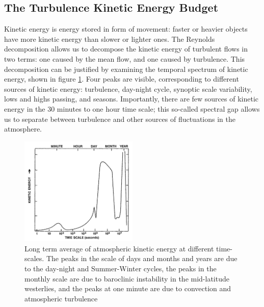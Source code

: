 \documentclass[a4paper,11pt]{kth-mag}
\begin{document}
\subsection{The Turbulence Kinetic Energy Budget}
Kinetic energy is energy stored in form of movement: faster or heavier objects have more kinetic energy than slower or lighter ones. The Reynolds decomposition allows us to decompose the kinetic energy of turbulent flows in two terms: one caused by the mean flow, and one caused by turbulence. This decomposition can be justified by examining the temporal spectrum of kinetic energy, shown in figure \ref{fig:tkespectrum}. Four peaks are visible, corresponding to different sources of kinetic energy: turbulence, day-night cycle, synoptic scale variability, lows and highs passing, and seasons. Importantly, there are few sources of kinetic energy in the 30 minutes to one hour time scale; this so-called spectral gap allows us to separate between turbulence and other sources of fluctuations in the atmosphere.

\begin{figure}
\caption{Long term average of atmospheric kinetic energy at different time-scales. The peaks in the scale of days and months and years are due to the day-night and Summer-Winter cycles, the peaks in the monthly scale are due to baroclinic instability in the mid-latitude westerlies, and the peaks at one minute are due to convection and atmospheric turbulence \citep{tkespectrumsrc,tkespectrumorig}}
\label{fig:tkespectrum}
\centering
\includegraphics[width=0.5\textwidth]{images/kinetic_energy_spectrum}
\end{figure}
\end{document}
